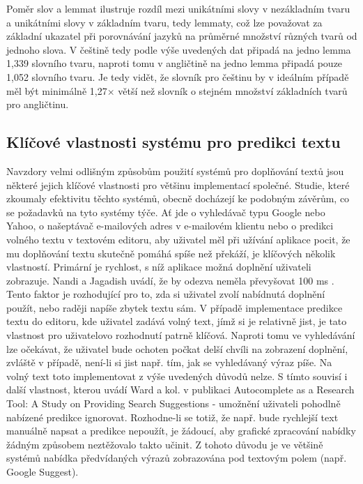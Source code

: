 \documentclass{article}
\begin{document}
Poměr slov a lemmat ilustruje rozdíl mezi unikátními slovy v nezákladním tvaru a unikátními slovy v základním tvaru, tedy lemmaty, což lze považovat za základní ukazatel při porovnávání jazyků na průměrné množství různých tvarů od jednoho slova. V češtině tedy podle výše uvedených dat připadá na jedno lemma 1,339 slovního tvaru, naproti tomu v angličtině na jedno lemma připadá pouze 1,052 slovního tvaru. Je tedy vidět, že slovník pro češtinu by v ideálním případě měl být minimálně 1,27× větší než slovník o stejném množství základních tvarů pro angličtinu.

\subsection{Klíčové vlastnosti systému pro predikci textu}

Navzdory velmi odlišným způsobům použití systémů pro doplňování textů jsou některé jejich klíčové vlastnosti pro většinu implementací společné. Studie, které zkoumaly efektivitu těchto systémů, obecně docházejí ke podobným závěrům, co se požadavků na tyto systémy týče. Ať jde o vyhledávač typu Google nebo Yahoo, o našeptávač e-mailových adres v e-mailovém klientu nebo o predikci volného textu v textovém editoru, aby uživatel měl při užívání aplikace pocit, že mu doplňování textu skutečně pomáhá spíše než překáží, je klíčových několik vlastností.  Primární je rychlost, s níž aplikace možná doplnění uživateli zobrazuje. Nandi a Jagadish uvádí, že by odezva neměla převyšovat 100 ms \cite{Nandi2007}. Tento faktor je rozhodující pro to, zda si uživatel zvolí nabídnutá doplnění použít, nebo raději napíše zbytek textu sám. V případě implementace predikce textu do editoru, kde uživatel zadává volný text, jímž si je relativně jist, je tato vlastnost pro uživatelovo rozhodnutí patrně klíčová. Naproti tomu ve vyhledávání lze očekávat, že uživatel bude ochoten počkat delší chvíli na zobrazení doplnění, zvláště v případě, není-li si jist např. tím, jak se vyhledávaný výraz píše. Na volný text toto implementovat z výše uvedených důvodů nelze.  S tímto souvisí i další vlastnost, kterou uvádí Ward a kol. v publikaci Autocomplete as a Research Tool: A Study on Providing Search Suggestions - umožnění uživateli pohodlně nabízené predikce ignorovat. Rozhodne-li se totiž, že např. bude rychlejší text manuálně napsat a predikce nepoužít, je žádoucí, aby grafické zpracování nabídky žádným způsobem neztěžovalo takto učinit. Z tohoto důvodu je ve většině systémů nabídka předvídaných výrazů zobrazována pod textovým polem (např. Google Suggest). 
\end{document}
